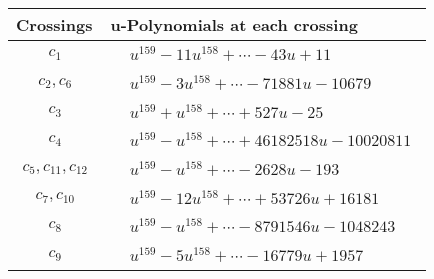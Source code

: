 \documentclass[1p]{elsarticle_modified}
\theoremstyle{definition}
\begin{document}
\begin{tabular}{m{50pt}|m{274pt}}
Crossings & \hspace{64pt}u-Polynomials at each crossing \\
\hline $$\begin{aligned}c_{1}\end{aligned}$$&$\begin{aligned}
&u^{159}-11 u^{158}+\cdots-43 u+11
\end{aligned}$\\
\hline $$\begin{aligned}c_{2},c_{6}\end{aligned}$$&$\begin{aligned}
&u^{159}-3 u^{158}+\cdots-71881 u-10679
\end{aligned}$\\
\hline $$\begin{aligned}c_{3}\end{aligned}$$&$\begin{aligned}
&u^{159}+u^{158}+\cdots+527 u-25
\end{aligned}$\\
\hline $$\begin{aligned}c_{4}\end{aligned}$$&$\begin{aligned}
&u^{159}- u^{158}+\cdots+46182518 u-10020811
\end{aligned}$\\
\hline $$\begin{aligned}c_{5},c_{11},c_{12}\end{aligned}$$&$\begin{aligned}
&u^{159}- u^{158}+\cdots-2628 u-193
\end{aligned}$\\
\hline $$\begin{aligned}c_{7},c_{10}\end{aligned}$$&$\begin{aligned}
&u^{159}-12 u^{158}+\cdots+53726 u+16181
\end{aligned}$\\
\hline $$\begin{aligned}c_{8}\end{aligned}$$&$\begin{aligned}
&u^{159}- u^{158}+\cdots-8791546 u-1048243
\end{aligned}$\\
\hline $$\begin{aligned}c_{9}\end{aligned}$$&$\begin{aligned}
&u^{159}-5 u^{158}+\cdots-16779 u+1957
\end{aligned}$\\
\hline
\end{tabular}\\~\\
\end{document}
